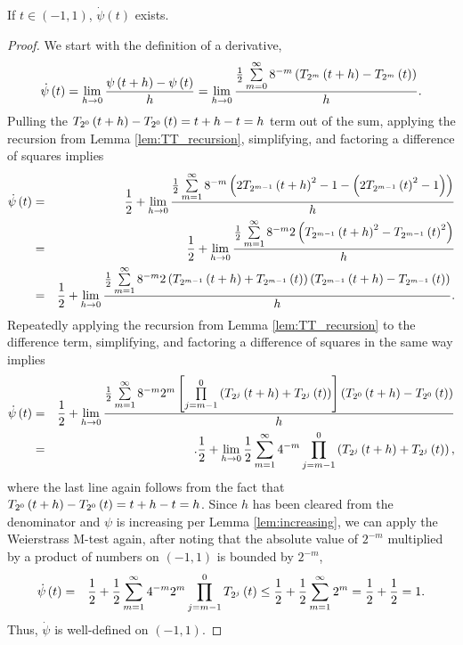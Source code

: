 \begin{proposition}
  \label{prop:derivative}
  If $t \in \left(-1,1\right)$, $\dot{\psi}\left(t\right)$ exists.
\end{proposition}
\begin{proof}
  We start with the definition of a derivative,
  \begin{eqnarray*}
    \dot{\psi}\left(t\right) = \lim\limits_{h \rightarrow 0} \frac{\psi\left(t + h\right) - \psi\left(t\right)}{h} = 
    \lim\limits_{h \rightarrow 0} \frac{\frac{1}{2} \sum\limits_{m = 0}^\infty 8^{-m} \left(T_{2^{m}}\left(t + h\right) - T_{2^{m}}\left(t\right)\right)}{h}.
  \end{eqnarray*}
  Pulling the $T_{2^{0}}\left(t + h\right) - T_{2^{0}}\left(t\right) = t + h - t = h$ term out of the sum, applying the recursion from Lemma \ref{lem:TT_recursion}, simplifying, and factoring a difference of squares implies
  \begin{eqnarray*}
    \dot{\psi}\left(t\right) &=& \frac{1}{2} + \lim\limits_{h \rightarrow 0} \frac{\frac{1}{2}\sum\limits_{m = 1}^\infty 8^{-m} \left(2T_{2^{m - 1}}\left(t + h\right)^2 - 1 - \left(2T_{2^{m - 1}}\left(t\right)^2 - 1\right)\right)}{h} \\  
    &=& \frac{1}{2} + \lim\limits_{h \rightarrow 0} \frac{\frac{1}{2}\sum\limits_{m = 1}^\infty 8^{-m} 2\left(T_{2^{m - 1}}\left(t + h\right)^2 - T_{2^{m - 1}}\left(t\right)^2\right)}{h} \\
    &=& \frac{1}{2} + \lim\limits_{h \rightarrow 0} \frac{\frac{1}{2}\sum\limits_{m = 1}^\infty 8^{-m} 2\left(T_{2^{m - 1}}\left(t + h\right) + T_{2^{m - 1}}\left(t\right)\right) \left(T_{2^{m - 1}}\left(t + h\right) - T_{2^{m - 1}}\left(t\right)\right)}{h}.
  \end{eqnarray*}
  Repeatedly applying the recursion from Lemma \ref{lem:TT_recursion} to the difference term, simplifying, and factoring a difference of squares in the same way implies
  \begin{eqnarray*}
    \dot{\psi}\left(t\right) &=& \frac{1}{2} + \lim\limits_{h \rightarrow 0} \frac{\frac{1}{2} \sum\limits_{m = 1}^\infty 8^{-m} 2^{m}\left[\prod\limits_{j = m - 1}^0 \left(T_{2^{j}}\left(t + h\right) + T_{2^{j}}\left(t\right)\right)\right]\left(T_{2^{0}}\left(t + h\right) - T_{2^{0}}\left(t\right)\right)}{h} \\  
    &=& .\frac{1}{2} + \lim\limits_{h \rightarrow 0} \frac{1}{2} \sum\limits_{m = 1}^\infty 4^{-m} \prod\limits_{j = m - 1}^0 \left(T_{2^{j}}\left(t + h\right) + T_{2^{j}}\left(t\right)\right),
  \end{eqnarray*}
  where the last line again follows from the fact that $T_{2^{0}}\left(t + h\right) - T_{2^{0}}\left(t\right) = t + h - t = h$. Since $h$ has been cleared from the denominator and $\psi$ is increasing per Lemma \ref{lem:increasing}, we can apply the Weierstrass M-test again, after noting that the absolute value of $2^{-m}$ multiplied by a product of numbers on $\left(-1,1\right)$ is bounded by $2^{-m}$,
  \begin{eqnarray*}
    \dot{\psi}\left(t\right)
    &=& \frac{1}{2} + \frac{1}{2} \sum\limits_{m = 1}^\infty 4^{-m} 2^m \prod\limits_{j = m - 1}^0 T_{2^{j}}\left(t\right)
    \leq \frac{1}{2} + \frac{1}{2} \sum\limits_{m = 1}^\infty 2^m = \frac{1}{2} + \frac{1}{2} = 1.
  \end{eqnarray*}
  Thus, $\dot{\psi}$ is well-defined on $\left(-1,1\right)$.
\end{proof}

